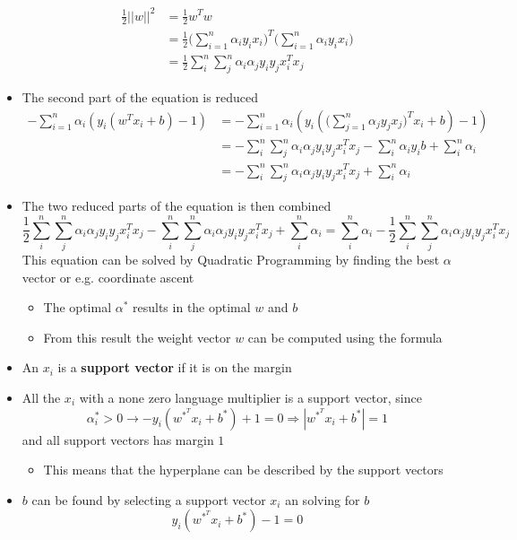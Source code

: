 \documentclass[a4, english]{article}
\begin{document}
\begin{itemize}
\begin{align*}
  \frac12||w||^2 &= \frac12 w^Tw \\
                 &= \frac12 \bigg(\sum_{i=1}^n \alpha_i y_i x_i\bigg)^T \bigg(\sum_{i=1}^n \alpha_i y_i x_i\bigg)\\
                 &= \frac12 \sum_i^n \sum_j^n \alpha_i\alpha_jy_iy_jx_i^Tx_j
\end{align*}
  \item The second part of the equation is reduced 
\begin{align*}
  - \sum_{i=1}^n \alpha_i (y_i(w^T x_i +b) -1) &=  - \sum_{i=1}^n \alpha_i (y_i(\bigg(\sum_{j=1}^n \alpha_j y_j x_j\bigg)^T x_i +b) -1)\\
                                            &= - \sum_i^n \sum_j^n \alpha_i\alpha_jy_iy_jx_i^Tx_j - \sum_i^n \alpha_iy_ib + \sum_i^n \alpha_i \\
                                            &= - \sum_i^n \sum_j^n \alpha_i\alpha_jy_iy_jx_i^Tx_j + \sum_i^n \alpha_i
\end{align*}
  \item The two reduced parts of the equation is then combined
\begin{equation*}
  \frac12\sum_i^n \sum_j^n \alpha_i\alpha_jy_iy_jx_i^Tx_j - \sum_i^n \sum_j^n \alpha_i\alpha_jy_iy_jx_i^Tx_j + \sum_i^n \alpha_i =   \sum_i^n \alpha_i - \frac12 \sum_i^n \sum_j^n \alpha_i\alpha_jy_iy_jx_i^Tx_j
\end{equation*}
  This equation can be solved by Quadratic Programming by finding the best $\alpha$ vector or e.g. coordinate ascent
  \begin{itemize}
    \item The optimal $\alpha^*$ results in the optimal $w$ and $b$ 
  	\item From this result the weight vector $w$ can be computed using the formula
  \end{itemize}
  \item An $x_i$ is a \textbf{support vector} if it is on the margin  
  \item All the $x_i$ with a none zero language multiplier is a support vector, since
\begin{equation*}
  \alpha_i^* > 0 \rightarrow -y_i (w^{*^T}x_i + b^*) +1 = 0 \Rightarrow |w^{*^T}x_i + b^*| = 1
\end{equation*}
  and all support vectors has margin $1$ 
  \begin{itemize}
  	\item This means that the hyperplane can be described by the support vectors 
  \end{itemize}
  \item $b$ can be found by selecting a support vector $x_i$ an solving for $b$ 
\begin{equation*}
  y_i (w^{*^T}x_i + b^*) - 1 = 0
\end{equation*}
\end{itemize}
\newpage
\end{document}
